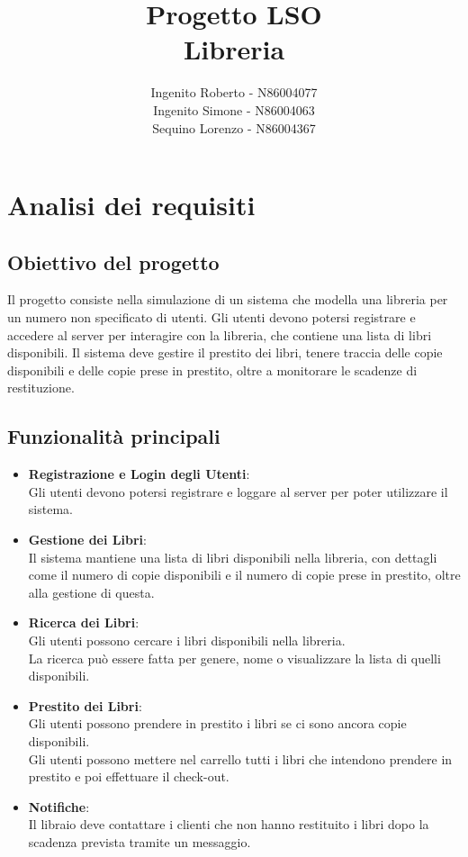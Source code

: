 \documentclass[]{report}
\title{\textbf{Progetto LSO}\\Libreria}
\author{
    Ingenito Roberto - N86004077\\
    Ingenito Simone - N86004063\\
    Sequino Lorenzo - N86004367 
   }
\date{}
\begin{document}
\maketitle

\newpage

\tableofcontents

\newpage
\chapter{Analisi dei requisiti}
\section{Obiettivo del progetto}
Il progetto consiste nella simulazione di un sistema che modella una libreria per un numero non specificato di utenti. Gli utenti devono potersi registrare e accedere al server per interagire con la libreria, che contiene una lista di libri disponibili. Il sistema deve gestire il prestito dei libri, tenere traccia delle copie disponibili e delle copie prese in prestito, oltre a monitorare le scadenze di restituzione.

\section{Funzionalità principali}
\begin{itemize}

	\item \textbf{Registrazione e Login degli Utenti}:\\
	      Gli utenti devono potersi registrare e loggare al server per poter utilizzare il sistema.
	\item \textbf{Gestione dei Libri}:\\
	      Il sistema mantiene una lista di libri disponibili nella libreria, con dettagli come il numero di copie disponibili e il numero di copie prese in prestito, oltre alla gestione di questa.
	\item \textbf{Ricerca dei Libri}:\\
	      Gli utenti possono cercare i libri disponibili nella libreria.\\
	      La ricerca può essere fatta per genere, nome o visualizzare la lista di quelli disponibili.
	\item \textbf{Prestito dei Libri}:\\
	      Gli utenti possono prendere in prestito i libri se ci sono ancora copie disponibili.\\
	      Gli utenti possono mettere nel carrello tutti i libri che intendono prendere in prestito e poi effettuare il check-out.
	\item \textbf{Notifiche}:\\
	      Il libraio deve contattare i clienti che non hanno restituito i libri dopo la scadenza prevista tramite un messaggio.
\end{itemize}
\end{document}

